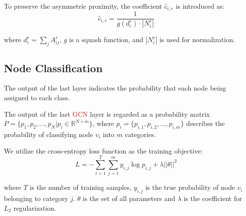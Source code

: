 To preserve the asymmetric proximity, the coefficient $\hat c_{i,r}$ is introduced as:
\begin{equation}
\hat c_{i,r}=\frac{1}{g(d_i^r)\cdot |N_i^r|}
\end{equation}

\noindent where $d_i^r=\sum_{j}A^r_{ij}$, $g$ is a squash function, and $|N_i^r|$ is used for normalization.



\subsection{Node Classification}
The output of the last layer indicates the probability that each node being assigned to each class.

The output of the last \textcolor{red}{GCN} layer is regarded as a probability matrix $P=\{p_1,p_2,...,p_N|p_i\in \mathbb{R}^{N \times m}\}$, where $p_i=\{p_{i,1},p_{i,2},...,p_{i,m}\}$ describes the probability of classifying node $v_i$ into $m$ categories.

We utilize the cross-entropy loss function as the training objective:
\begin{equation}
L=-\sum_{i=1}^T\sum_{j=1}^m y_{i,j}\log p_{i,j}+\lambda ||\theta||^2
\end{equation}

\noindent where $T$ is the number of training samples, $y_{i,j}$ is the true probability of node $v_i$ belonging to category $j$. $\theta$ is the set of all parameters and $\lambda$ is the coefficient for $L_2$  regularization.
